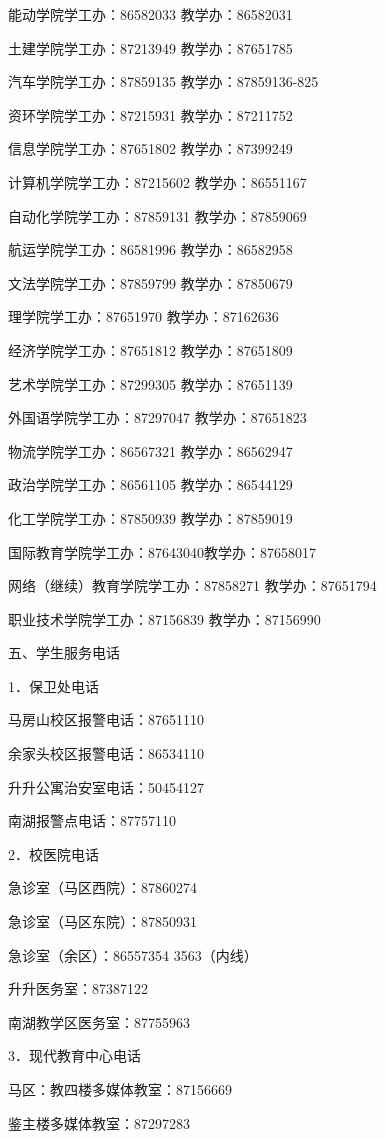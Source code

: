 \documentclass[UTF8,12pt,a4paper]{report}
\begin{document}
能动学院学工办：86582033 教学办：86582031

土建学院学工办：87213949 教学办：87651785

汽车学院学工办：87859135 教学办：87859136-825

资环学院学工办：87215931 教学办：87211752

信息学院学工办：87651802 教学办：87399249

计算机学院学工办：87215602 教学办：86551167

自动化学院学工办：87859131 教学办：87859069

航运学院学工办：86581996 教学办：86582958

文法学院学工办：87859799 教学办：87850679

理学院学工办：87651970 教学办：87162636

经济学院学工办：87651812 教学办：87651809

艺术学院学工办：87299305 教学办：87651139

外国语学院学工办：87297047 教学办：87651823

物流学院学工办：86567321 教学办：86562947

政治学院学工办：86561105 教学办：86544129

化工学院学工办：87850939 教学办：87859019

国际教育学院学工办：87643040教学办：87658017

网络（继续）教育学院学工办：87858271 教学办：87651794

职业技术学院学工办：87156839 教学办：87156990



五、学生服务电话

1．保卫处电话

马房山校区报警电话：87651110

余家头校区报警电话：86534110

升升公寓治安室电话：50454127

南湖报警点电话：87757110

2．校医院电话

急诊室（马区西院）：87860274

急诊室（马区东院）：87850931

急诊室（余区）：86557354 3563（内线）

升升医务室：87387122

南湖教学区医务室：87755963

3．现代教育中心电话

马区：教四楼多媒体教室：87156669

鉴主楼多媒体教室：87297283
\end{document}
